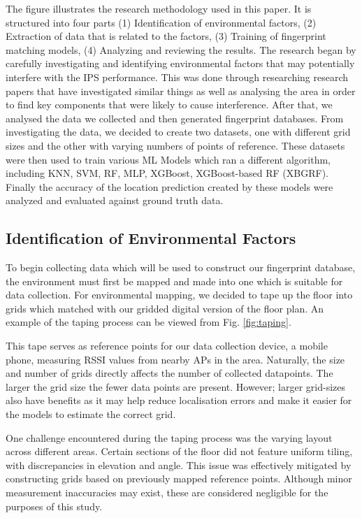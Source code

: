 \documentclass[conference]{IEEEtran}
\begin{document}
	The figure illustrates the research methodology used in this paper. It is structured into four parts (1) Identification of environmental factors, (2) Extraction of data that is related to the factors, (3) Training of fingerprint matching models, (4) Analyzing and reviewing the results. The research began by carefully investigating and identifying environmental factors that may potentially interfere with the IPS performance. This was done through researching research papers that have investigated similar things as well as analysing the area in order to find key components that were likely to cause interference. After that, we analysed the data we collected and then generated fingerprint databases. From investigating the data, we decided to create two datasets, one with different grid sizes and the other with varying numbers of points of reference. These datasets were then used to train various ML Models which ran a different algorithm, including KNN, SVM, RF, MLP, XGBoost, XGBoost-based RF (XBGRF). Finally the accuracy of the location prediction created by these models were analyzed and evaluated against ground truth data.
	
	
	
	\subsection{Identification of Environmental Factors}
	To begin collecting data which will be used to construct our fingerprint database, the environment must first be mapped and made into one which is suitable for data collection. For environmental mapping, we decided to tape up the floor into grids which matched with our gridded digital version of the floor plan. An example of the taping process can be viewed from Fig. \ref{fig:taping}. 
	
	This tape serves as reference points for our data collection device, a mobile phone, measuring RSSI values from nearby APs in the area. Naturally, the size and number of grids directly affects the number of collected datapoints. The larger the grid size the fewer data points are present. However; larger grid-sizes also have benefits as it may help reduce localisation errors and make it easier for the models to estimate the correct grid.
	
	
	One challenge encountered during the taping process was the varying layout across different areas. Certain sections of the floor did not feature uniform tiling, with discrepancies in elevation and angle. This issue was effectively mitigated by constructing grids based on previously mapped reference points. Although minor measurement inaccuracies may exist, these are considered negligible for the purposes of this study.
	
\end{document}
